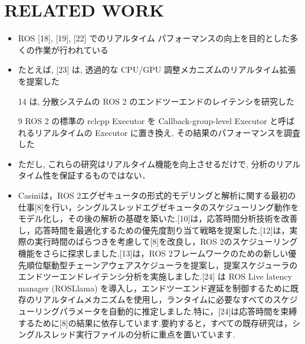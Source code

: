 
\section{RELATED WORK}
\label{sec: related work}


\begin{frame}{}
    \begin{itemize}
        \item ROS [18], [19], [22] でのリアルタイム パフォーマンスの向上を目的とした多くの作業が行われている
\item たとえば, [23] は, 透過的な CPU/GPU 調整メカニズムのリアルタイム拡張を提案した
\item [14] は, 分散システムの ROS 2 のエンドツーエンドのレイテンシを研究した
\item [9] ROS 2 の標準の rclcpp Executor を Callback-group-level Executor と呼ばれるリアルタイムの Executor に置き換え, その結果のパフォーマンスを調査した
\item ただし, これらの研究はリアルタイム機能を向上させるだけで, 分析のリアルタイム性を保証するものではない．
    \end{itemize}
\end{frame}

\begin{frame}{}
    \begin{itemize}
        \item Casiniは，ROS 2エグゼキュータの形式的モデリングと解析に関する最初の仕事[8]を行い，シングルスレッドエグゼキュータのスケジューリング動作をモデル化し，その後の解析の基礎を築いた.[10]は，応答時間分析技術を改善し，応答時間を最適化するための優先度割り当て戦略を提案した.[12]は，実際の実行時間のばらつきを考慮して[8]を改良し，ROS 2のスケジューリング機能をさらに探求しました.[13]は，ROS 2フレームワークのための新しい優先順位駆動型チェーンアウェアスケジューラを提案し，提案スケジューラのエンドツーエンドレイテンシ分析を実施しました.[24] は ROS Live latency manager (ROSLlama) を導入し，エンドツーエンド遅延を制御するために既存のリアルタイムメカニズムを使用し，ランタイムに必要なすべてのスケジューリングパラメータを自動的に推定しました.特に，[24]は応答時間を束縛するために[8]の結果に依存しています.要約すると，すべての既存研究は，シングルスレッド実行ファイルの分析に重点を置いています.
    \end{itemize}
\end{frame}

